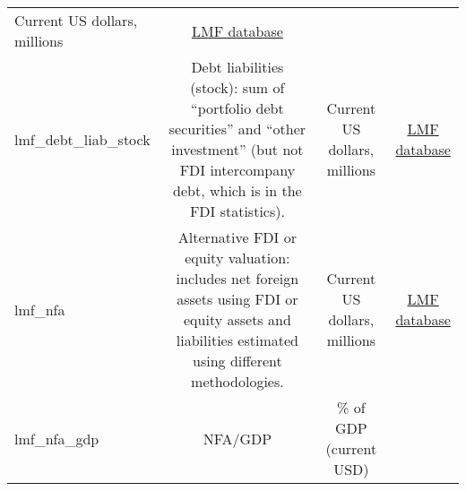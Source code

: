 \documentclass[]{article}
\begin{document}
\begin{longtable}[]{@{}lccc@{}}
\begin{minipage}[t]{0.24\columnwidth}
Current US dollars, millions\strut
\end{minipage} & \begin{minipage}[t]{0.15\columnwidth}\centering\strut
\href{http://www.philiplane.org/EWN.html}{LMF database}\strut
\end{minipage}\tabularnewline
\begin{minipage}[t]{0.14\columnwidth}\raggedright\strut
lmf\_debt\_liab\_stock\strut
\end{minipage} & \begin{minipage}[t]{0.36\columnwidth}\centering\strut
Debt liabilities (stock): sum of ``portfolio debt securities'' and
``other investment'' (but not FDI intercompany debt, which is in the FDI
statistics).\strut
\end{minipage} & \begin{minipage}[t]{0.24\columnwidth}\centering\strut
Current US dollars, millions\strut
\end{minipage} & \begin{minipage}[t]{0.15\columnwidth}\centering\strut
\href{http://www.philiplane.org/EWN.html}{LMF database}\strut
\end{minipage}\tabularnewline
\begin{minipage}[t]{0.14\columnwidth}\raggedright\strut
lmf\_nfa\strut
\end{minipage} & \begin{minipage}[t]{0.36\columnwidth}\centering\strut
Alternative FDI or equity valuation: includes net foreign assets using
FDI or equity assets and liabilities estimated using different
methodologies.\strut
\end{minipage} & \begin{minipage}[t]{0.24\columnwidth}\centering\strut
Current US dollars, millions\strut
\end{minipage} & \begin{minipage}[t]{0.15\columnwidth}\centering\strut
\href{http://www.philiplane.org/EWN.html}{LMF database}\strut
\end{minipage}\tabularnewline
\begin{minipage}[t]{0.14\columnwidth}\raggedright\strut
lmf\_nfa\_gdp\strut
\end{minipage} & \begin{minipage}[t]{0.36\columnwidth}\centering\strut
NFA/GDP\strut
\end{minipage} & \begin{minipage}[t]{0.24\columnwidth}\centering\strut
\% of GDP (current USD)\strut
\end{minipage} & \begin{minipage}[t]{0.15\columnwidth}\centering\strut

\end{minipage}
\end{longtable}
\end{document}
